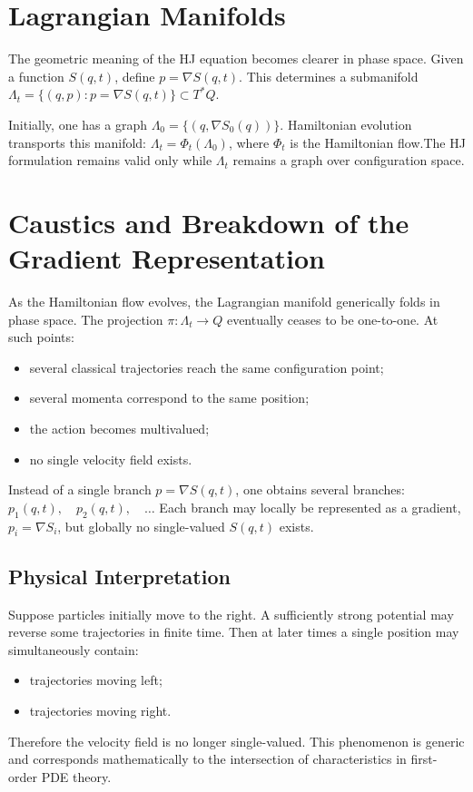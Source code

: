 \section{Lagrangian Manifolds}

The geometric meaning of the HJ equation becomes clearer in phase space.
Given a function $S(q,t)$, define $p=\nabla S(q,t)$.
This determines a submanifold $\Lambda_t=\{(q,p):p=\nabla S(q,t)\}\subset T^*Q$.

Initially, one has a graph $\Lambda_0=\{(q,\nabla S_0(q))\}$.
Hamiltonian evolution transports this manifold: $\Lambda_t=\Phi_t(\Lambda_0)$,
where $\Phi_t$ is the Hamiltonian flow.The HJ formulation remains valid only 
while $\Lambda_t$ remains a graph over configuration space.

\section{Caustics and Breakdown of the Gradient Representation}

As the Hamiltonian flow evolves, the Lagrangian manifold generically folds in
phase space. The projection $\pi:\Lambda_t\to Q$ eventually ceases to be
one-to-one. At such points:
\begin{itemize}
\item several classical trajectories reach the same configuration point;
\item several momenta correspond to the same position;
\item the action becomes multivalued;
\item no single velocity field exists.
\end{itemize}
Instead of a single branch $p=\nabla S(q,t)$,
one obtains several branches: $p_1(q,t),\quad p_2(q,t),\quad \dots$
Each branch may locally be represented as a gradient,
$p_i=\nabla S_i$, but globally no single-valued $S(q,t)$ exists.

\subsection{Physical Interpretation}

Suppose particles initially move to the right. A sufficiently strong potential
may reverse some trajectories in finite time. Then at later times a single
position may simultaneously contain:
\begin{itemize}
\item trajectories moving left;
\item trajectories moving right.
\end{itemize}
Therefore the velocity field is no longer single-valued.
This phenomenon is generic and corresponds mathematically to the intersection
of characteristics in first-order PDE theory.

